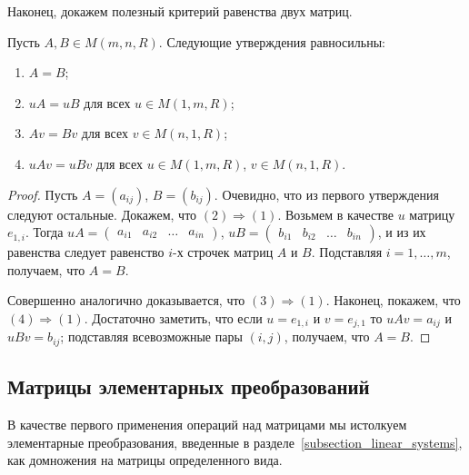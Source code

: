 Наконец, докажем полезный критерий равенства двух матриц.
\begin{proposition}\label{prop:equal-matrices}
Пусть $A,B\in M(m,n,R)$. Следующие утверждения равносильны:
\begin{enumerate}
\item $A = B$;
\item $uA = uB$ для всех $u\in M(1,m,R)$;
\item $Av = Bv$ для всех $v\in M(n,1,R)$;
\item $uAv = uBv$ для всех $u\in M(1,m,R)$, $v\in M(n,1,R)$.
\end{enumerate}
\end{proposition}
\begin{proof}
Пусть $A = (a_{ij})$, $B = (b_{ij})$.
Очевидно, что из первого утверждения следуют остальные.
Докажем, что $(2)\Rightarrow (1)$.
Возьмем в качестве $u$ матрицу $e_{1,i}$. Тогда
$uA = \begin{pmatrix} a_{i1} & a_{i2} & \dots & a_{in} \end{pmatrix}$,
$uB = \begin{pmatrix} b_{i1} & b_{i2} & \dots & b_{in} \end{pmatrix}$,
и из их равенства следует равенство $i$-х строчек матриц $A$ и $B$.
Подставляя $i=1,\dots,m$, получаем, что $A=B$.

Совершенно аналогично доказывается, что $(3)\Rightarrow (1)$.
Наконец, покажем, что $(4)\Rightarrow (1)$.
Достаточно заметить, что если $u = e_{1,i}$ и $v = e_{j,1}$
то $uAv = a_{ij}$ и $uBv = b_{ij}$; подставляя всевозможные пары
$(i,j)$, получаем, что $A = B$.
\end{proof}


\subsection{Матрицы элементарных преобразований}

В качестве первого применения операций над матрицами мы истолкуем
элементарные преобразования, введенные в
разделе~\ref{subsection_linear_systems}, как домножения на матрицы
определенного вида.


